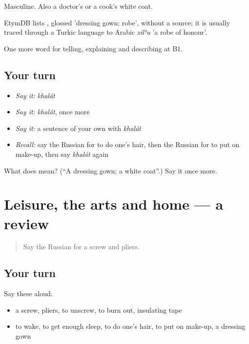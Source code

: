 Masculine. Also a doctor's or a cook's white coat.

\begin{cousinweb}
EtymDB lists \emph{}, glossed 'dressing gown; robe', without a source; it is usually traced through a Turkic language to Arabic \emph{xilʿa} 'a robe of honour'.
\end{cousinweb}

\begin{grammarlens}[title={What you've built}]
One more word for telling, explaining and describing at B1.
\end{grammarlens}

\subsection*{Your turn}
\begin{itemize}
\raggedright
  \item \emph{Say it:} \emph{khalát}
  \item \emph{Say it:} \emph{khalát}, once more
  \item \emph{Say it:} a sentence of your own with \emph{khalát}
  \item \emph{Recall:} say the Russian for to do one's hair, then the Russian for to put on make-up, then say \emph{khalát} again
\end{itemize}

\begin{tcolorbox}[breakable,colback=teal!4,colframe=teal!35!black,title={Before you move on}]
What does  mean? (\textquotedblleft{}A dressing gown; a white coat\textquotedblright{}.) Say it once more.
\end{tcolorbox}
\section[(dialogue)]{Leisure, the arts and home — a review}

\label{lesson:RU-R534-review-533-534}



\begin{quote}
Say the Russian for a screw and pliers.
\end{quote}

\subsection*{Your turn}
Say these aloud:

\begin{itemize}
\raggedright
  \item a screw, pliers, to unscrew, to burn out, insulating tape
  \item to wake, to get enough sleep, to do one's hair, to put on make-up, a dressing gown
\end{itemize}

